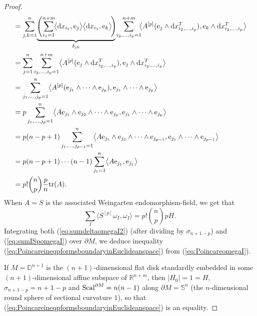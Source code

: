 \documentclass[pdftex]{sigma}
\numberwithin{equation}{section}
\begin{document}
\begin{proof}
\begin{align}
&= \sum_{j,k=1}^n\!\underbrace{\left(\sum_{i_1=1}^{n+m}\!\bigl\langle {\rm d}x_{i_1},{\rm e}_j\bigr\rangle\bigl\langle {\rm d}x_{i_1},{\rm e}_k\bigr\rangle\!\right)\!}_{\delta_{jk}}\sum_{i_2,\dots,i_p=1}^{n+m}\!\!\bigl\langle A^{[p]}({\rm e}_j\wedge {\rm d}x_{i_2,\dots,i_p}^T),{\rm e}_k\wedge {\rm d}x_{i_2,\dots,i_p}^T\bigr\rangle\nonumber\\
&= \sum_{j=1}^n\sum_{i_2,\dots,i_p=1}^{n+m}\bigl\langle A^{[p]}({\rm e}_j\wedge {\rm d}x_{i_2,\dots,i_p}^T),{\rm e}_j\wedge {\rm d}x_{i_2,\dots,i_p}^T\bigr\rangle\nonumber\\
&= \sum_{j_1,\dots,j_p=1}^n\bigl\langle A^{[p]}({\rm e}_{j_1}\wedge\dots\wedge {\rm e}_{j_p}),{\rm e}_{j_1}\wedge\dots\wedge {\rm e}_{j_p}\bigr\rangle\nonumber\\
&= p\sum_{j_1,\dots,j_p=1}^n\bigl\langle A{\rm e}_{j_1}\wedge {\rm e}_{j_2}\wedge\dots\wedge {\rm e}_{j_p},{\rm e}_{j_1}\wedge\dots\wedge {\rm e}_{j_p}\bigr\rangle\nonumber\\
&= p(n-p+1)\sum_{j_1,\dots,j_{p-1}=1}^n\bigl\langle A{\rm e}_{j_1}\wedge {\rm e}_{j_2}\wedge\dots\wedge {\rm e}_{j_{p-1}},{\rm e}_{j_1}\wedge\dots\wedge {\rm e}_{j_{p-1}}\bigr\rangle\nonumber\\
&= p(n-p+1)\cdots(n-1)\sum_{j_1=1}^n\bigl\langle A{\rm e}_{j_1},{\rm e}_{j_1}\bigr\rangle\nonumber\\
&= p!\binom{n}{p}\frac{p}{n}{\rm tr}(A).\label{eq:traceap}
\end{align}
When $A=S$ is the associated Weingarten endomorphism-field, we get that
\begin{equation}\label{eq:sumISpomegaI}
\sum_I\bigl\langle S^{[p]}\omega_I,\omega_I\bigr\rangle=p!\binom{n}{p}pH.
\end{equation}
Integrating both (\ref{eq:sumdeltaomegaI2}) (after dividing by $\sigma_{n+1-p}$) and (\ref{eq:sumISpomegaI}) over $\partial M$, we deduce i\-ne\-qua\-li\-ty (\ref{eq:PoincareineqpformsboundaryinEuclideanspace}) from (\ref{eq:PoincareomegaI}).

If $M=\mathbb{D}^{n+1}$ is the $(n+1)$-dimensional flat disk standardly embedded in some $(n+1)$-dimensional affine subspace of $\mathbb{R}^{n+m}$, then $|H_0|=1=H$, $\sigma_{n+1-p}=n+1-p$ and  ${\rm Scal}^{\partial M}=n(n-1)$  along $\partial M=\mathbb{S}^n$ (the $n$-dimensional round sphere of sectional curvature $1$), so that (\ref{eq:PoincareineqpformsboundaryinEuclideanspace})  is an equality.


\end{proof}
\end{document}

